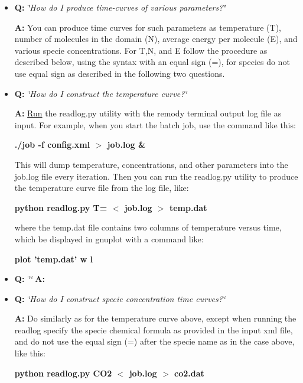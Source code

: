 \begin{itemize}
\item {\bf Q:}\label{_readlog}
 {\em \char`\"{}How do I produce time-curves of various parameters?\char`\"{}\/}\par
 {\bf A:} You can produce time curves for such parameters as temperature (T), number of molecules in the domain (N), average energy per molecule (E), and various specie concentrations. For T,N, and E follow the procedure as described below, using the syntax with an equal sign (=), for species do not use equal sign as described in the following two questions.\end{itemize}


\begin{itemize}
\item {\bf Q:} {\em \char`\"{}How do I construct the temperature curve?\char`\"{}\/}\par
 {\bf A:} \hyperlink{namespaceRun}{Run} the readlog.py utility with the remody terminal output log file as input. For example, when you start the batch job, use the command like this:\par
\par
{\bf  ./job -f config.xml $>$ job.log \& }\par
\par
 This will dump temperature, concentrations, and other parameters into the job.log file every iteration. Then you can run the readlog.py utility to produce the temperature curve file from the log file, like: \par
\par
{\bf  python readlog.py T= $<$ job.log $>$ temp.dat }\par
\par
 where the temp.dat file contains two columns of temperature versus time, which be displayed in gnuplot with a command like:\par
\par
{\bf plot 'temp.dat' w l}\par
\par
\end{itemize}


\begin{itemize}
\item {\bf Q:} {\em \char`\"{}\char`\"{}\/} {\bf A:}\end{itemize}


\begin{itemize}
\item {\bf Q:} {\em \char`\"{}How do I construct specie concentration time curves?\char`\"{}\/}\par
 {\bf A:} Do similarly as for the temperature curve above, except when running the readlog specify the specie chemical formula as provided in the input xml file, and do not use the equal sign (=) after the specie name as in the case above, like this:\par
\par
{\bf  python readlog.py CO2 $<$ job.log $>$ co2.dat }\par
\par
\end{itemize}


